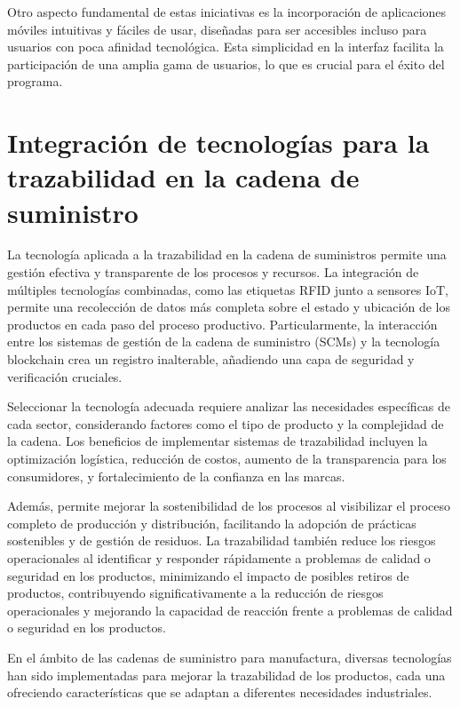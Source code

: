 \documentclass[main.tex]{subfiles}
\begin{document}
Otro aspecto fundamental de estas iniciativas es la incorporación de aplicaciones móviles intuitivas y fáciles de usar, diseñadas para ser accesibles incluso para usuarios con poca afinidad tecnológica. Esta simplicidad en la interfaz facilita la participación de una amplia gama de usuarios, lo que es crucial para el éxito del programa.

\section{Integración de tecnologías para la trazabilidad en la cadena de suministro}

La tecnología aplicada a la trazabilidad en la cadena de suministros permite una gestión efectiva y transparente de los procesos y recursos. La integración de múltiples tecnologías combinadas, como las etiquetas RFID junto a sensores IoT, permite una recolección de datos más completa sobre el estado y ubicación de los productos en cada paso del proceso productivo. Particularmente, la interacción entre los sistemas de gestión de la cadena de suministro (SCMs) y la tecnología blockchain crea un registro inalterable, añadiendo una capa de seguridad y verificación cruciales.

Seleccionar la tecnología adecuada requiere analizar las necesidades específicas de cada sector, considerando factores como el tipo de producto y la complejidad de la cadena. Los beneficios de implementar sistemas de trazabilidad incluyen la optimización logística, reducción de costos, aumento de la transparencia para los consumidores, y fortalecimiento de la confianza en las marcas.

Además, permite mejorar la sostenibilidad de los procesos al visibilizar el proceso completo de producción y distribución, facilitando la adopción de prácticas sostenibles y de gestión de residuos. La trazabilidad también reduce los riesgos operacionales al identificar y responder rápidamente a problemas de calidad o seguridad en los productos, minimizando el impacto de posibles retiros de productos, contribuyendo significativamente a la reducción de riesgos operacionales y mejorando la capacidad de reacción frente a problemas de calidad o seguridad en los productos.

En el ámbito de las cadenas de suministro para manufactura, diversas tecnologías han sido implementadas para mejorar la trazabilidad de los productos, cada una ofreciendo características que se adaptan a diferentes necesidades industriales.
\end{document}

